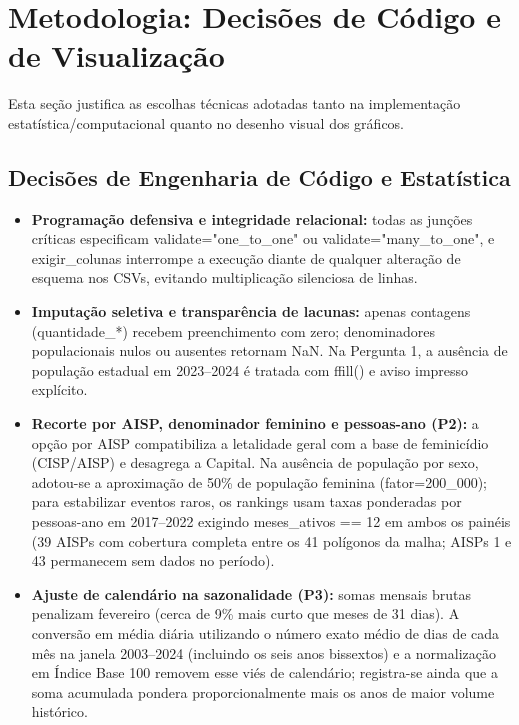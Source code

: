 \documentclass[11pt,a4paper]{article}
\newcommand{\code}[1]{{\ttfamily\footnotesize\allowbreak #1}}
\begin{document}
\section{Metodologia: Decisões de Código e de Visualização}

Esta seção justifica as escolhas técnicas adotadas tanto na implementação estatística/computacional quanto no desenho visual dos gráficos.

\subsection{Decisões de Engenharia de Código e Estatística}
\begin{itemize}
  \setlength{\itemsep}{3pt}\setlength{\parskip}{0pt}
  \item \textbf{Programação defensiva e integridade relacional:} todas as junções críticas especificam \code{validate="one\_to\_one"} ou \code{validate="many\_to\_one"}, e \code{exigir\_colunas} interrompe a execução diante de qualquer alteração de esquema nos CSVs, evitando multiplicação silenciosa de linhas.
  \item \textbf{Imputação seletiva e transparência de lacunas:} apenas contagens (\code{quantidade\_*}) recebem preenchimento com zero; denominadores populacionais nulos ou ausentes retornam \code{NaN}. Na Pergunta 1, a ausência de população estadual em 2023--2024 é tratada com \code{ffill()} e aviso impresso explícito.
  \item \textbf{Recorte por AISP, denominador feminino e pessoas-ano (P2):} a opção por AISP compatibiliza a letalidade geral com a base de feminicídio (CISP/AISP) e desagrega a Capital. Na ausência de população por sexo, adotou-se a aproximação de 50\% de população feminina (\code{fator=200\_000}); para estabilizar eventos raros, os rankings usam taxas ponderadas por pessoas-ano em 2017--2022 exigindo \code{meses\_ativos == 12} em ambos os painéis (39 AISPs com cobertura completa entre os 41 polígonos da malha; AISPs 1 e 43 permanecem sem dados no período).
  \item \textbf{Ajuste de calendário na sazonalidade (P3):} somas mensais brutas penalizam fevereiro (cerca de 9\% mais curto que meses de 31 dias). A conversão em média diária utilizando o número exato médio de dias de cada mês na janela 2003--2024 (incluindo os seis anos bissextos) e a normalização em Índice Base 100 removem esse viés de calendário; registra-se ainda que a soma acumulada pondera proporcionalmente mais os anos de maior volume histórico.

\end{itemize}
\end{document}
